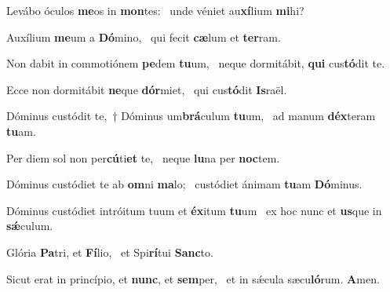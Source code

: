 \item Levábo óculos \textbf{me}os in \textbf{mon}tes:~\psstar{} unde véniet au\textbf{xí}lium \textbf{mi}hi?

\item Auxílium \textbf{me}um a \textbf{Dó}mino,~\psstar{} qui fecit \textbf{cæ}lum et \textbf{ter}ram.

\item Non dabit in commotiónem \textbf{pe}dem \textbf{tu}um,~\psstar{} neque dormitábit, \textbf{qui} cus\textbf{tó}dit te.

\item Ecce non dormitábit \textbf{ne}que \textbf{dór}miet,~\psstar{} qui cus\textbf{tó}dit \textbf{Is}raël.

\item Dóminus custódit te,~† Dóminus um\textbf{brá}culum \textbf{tu}um,~\psstar{} ad manum \textbf{déx}teram \textbf{tu}am.

\item Per diem sol non per\textbf{cú}ti\textbf{et} te,~\psstar{} neque \textbf{lu}na per \textbf{noc}tem.

\item Dóminus custódiet te ab \textbf{om}ni \textbf{ma}lo;~\psstar{} custódiet ánimam \textbf{tu}am \textbf{Dó}minus.

\item Dóminus custódiet intróitum tuum et \textbf{éx}itum \textbf{tu}um~\psstar{} ex hoc nunc et \textbf{us}que in \textbf{sǽ}culum.

\item Glória \textbf{Pa}tri, et \textbf{Fí}lio,~\psstar{} et Spi\textbf{rí}tui \textbf{Sanc}to.

\item Sicut erat in princípio, et \textbf{nunc}, et \textbf{sem}per,~\psstar{} et in sǽcula sæcu\textbf{ló}rum. \textbf{A}men.